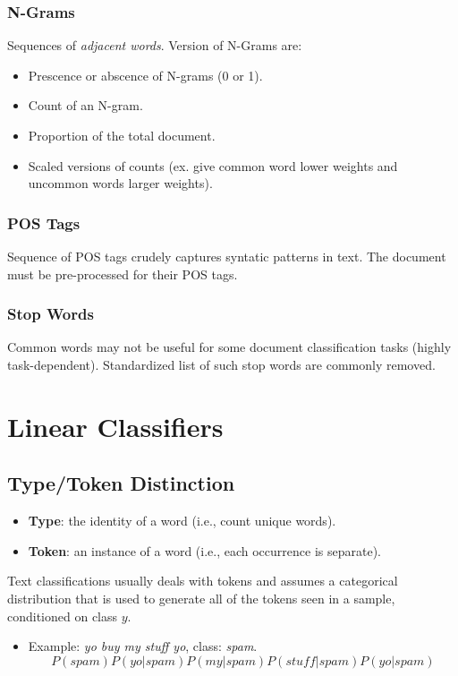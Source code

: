 \documentclass{article}
\begin{document}
\subsubsection{N-Grams}
Sequences of \textit{adjacent words}. Version of N-Grams are:
\begin{itemize}
    \item Prescence or abscence of N-grams (0 or 1).
    \item Count of an N-gram.
    \item Proportion of the total document.
    \item Scaled versions of counts (ex. give common word lower weights and uncommon words larger weights).
\end{itemize}
\subsubsection{POS Tags}
Sequence of POS tags crudely captures syntatic patterns in text. The document must be pre-processed for their POS tags.
\subsubsection{Stop Words}
Common words may not be useful for some document classification tasks (highly task-dependent). Standardized list of such stop words are commonly removed.

\section{Linear Classifiers}
\subsection{Type/Token Distinction}
\begin{itemize}
    \item \textbf{Type}: the identity of a word (i.e., count unique words).
    \item \textbf{Token}: an instance of a word (i.e., each occurrence is separate).
\end{itemize}
Text classifications usually deals with tokens and assumes a categorical distribution that is used to generate all of the tokens seen in a sample, conditioned on class $y$.
\begin{itemize}
    \item Example: \textit{yo buy my stuff yo}, class: \textit{spam}.
    \[P(spam)P(yo|spam)P(my|spam)P(\textit{stuff}|spam)P(yo|spam)\]
\end{itemize}
\end{document}
